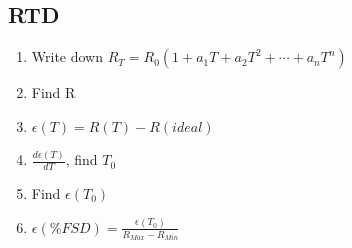 \documentclass{article}
\begin{document}
  \subsection{RTD}
  \begin{enumerate}
    \item Write down $R_T = R_0(1+a_1T + a_2T^2 + \cdots + a_nT^n)$
    \item Find R
    \item $\epsilon(T) = R(T) - R(ideal)$
    \item $\frac{d\epsilon (T)}{dT}$, find $T_0$
    \item Find $\epsilon (T_0)$
    \item $\epsilon(\% FSD) = \frac{\epsilon (T_0)}{R_{Max} - R_{Min}}$
  \end{enumerate}
\end{document}
